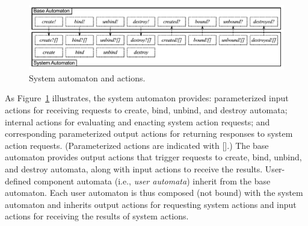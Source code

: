 \begin{figure}
\center
\includegraphics[width=\textwidth]{system_action}
\caption{System automaton and actions.}
\label{system_action}
\end{figure}
As Figure~\ref{system_action} illustrates, the system automaton provides: parameterized input actions for receiving requests to create, bind, unbind, and destroy automata; internal actions for evaluating and enacting system action requests; and corresponding parameterized output actions for returning responses to system action requests.
(Parameterized actions are indicated with [].)
The base automaton provides output actions that trigger requests to create, bind, unbind, and destroy automata, along with
input actions to receive the results.
User-defined component automata (i.e., \emph{user automata}) inherit from the base automaton.
Each user automaton is thus composed (not bound) with the system automaton and inherits output actions for requesting system actions and input actions for receiving the results of system actions.

